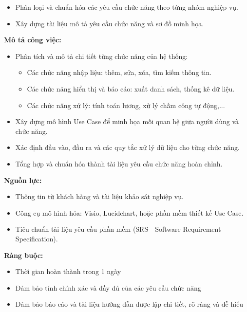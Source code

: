 {\begin{minipage}{\textwidth}
\begin{itemize}
        \item Phân loại và chuẩn hóa các yêu cầu chức năng theo từng nhóm nghiệp vụ.
        \item Xây dựng tài liệu mô tả yêu cầu chức năng và sơ đồ minh họa.
    \end{itemize}
    \vspace{0.5cm}
    \noindent \textbf{Mô tả công việc:}
    \begin{itemize}
        \item Phân tích và mô tả chi tiết từng chức năng của hệ thống:
        \begin{itemize}
            \item Các chức năng nhập liệu: thêm, sửa, xóa, tìm kiếm thông tin.
            \item Các chức năng hiển thị và báo cáo: xuất danh sách, thống kê dữ liệu.
            \item Các chức năng xử lý: tính toán lương, xử lý chấm công tự động,...
        \end{itemize}
        \item Xây dựng mô hình Use Case để minh họa mối quan hệ giữa người dùng và chức năng.
        \item Xác định đầu vào, đầu ra và các quy tắc xử lý dữ liệu cho từng chức năng.
        \item Tổng hợp và chuẩn hóa thành tài liệu yêu cầu chức năng hoàn chỉnh.
    \end{itemize}
    \vspace{0.5cm}
    \noindent \textbf{Nguồn lực:}
    \begin{itemize}
        \item Thông tin từ khách hàng và tài liệu khảo sát nghiệp vụ.
        \item Công cụ mô hình hóa: Visio, Lucidchart, hoặc phần mềm thiết kế Use Case.
        \item Tiêu chuẩn tài liệu yêu cầu phần mềm (SRS - Software Requirement Specification).
    \end{itemize}
    \vspace{0.5cm}
    \noindent \textbf{Ràng buộc:}
    \begin{itemize}
        \item Thời gian hoàn thành trong 1 ngày
        \item Đảm bảo tính chính xác và đầy đủ của các yêu cầu chức năng
        \item Đảm bảo báo cáo và tài liệu hướng dẫn được lập chi tiết, rõ ràng và dễ hiểu
    \end{itemize}
    \end{minipage}
}

